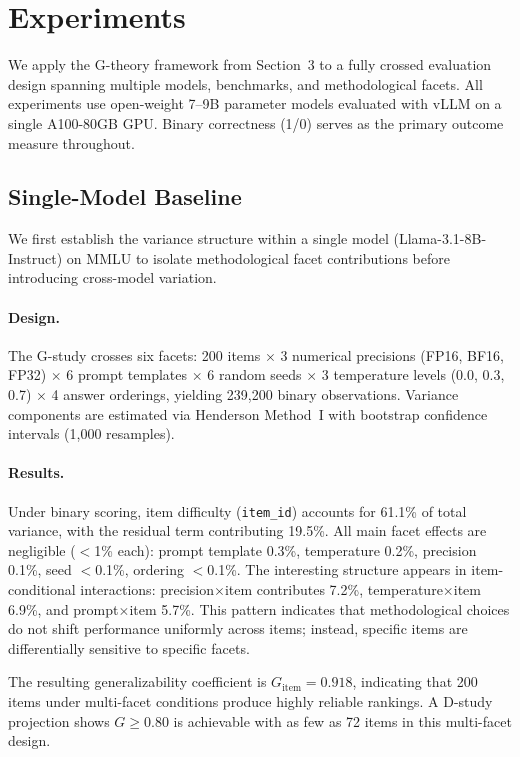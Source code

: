 \section{Experiments}

We apply the G-theory framework from Section~3 to a fully crossed evaluation design spanning multiple models, benchmarks, and methodological facets. All experiments use open-weight 7--9B parameter models evaluated with vLLM on a single A100-80GB GPU. Binary correctness (1/0) serves as the primary outcome measure throughout.

\subsection{Single-Model Baseline}

We first establish the variance structure within a single model (Llama-3.1-8B-Instruct) on MMLU to isolate methodological facet contributions before introducing cross-model variation.

\paragraph{Design.} The G-study crosses six facets: 200 items $\times$ 3 numerical precisions (FP16, BF16, FP32) $\times$ 6 prompt templates $\times$ 6 random seeds $\times$ 3 temperature levels (0.0, 0.3, 0.7) $\times$ 4 answer orderings, yielding 239,200 binary observations. Variance components are estimated via Henderson Method~I with bootstrap confidence intervals (1,000 resamples).

\paragraph{Results.} Under binary scoring, item difficulty (\texttt{item\_id}) accounts for 61.1\% of total variance, with the residual term contributing 19.5\%. All main facet effects are negligible ($<$1\% each): prompt template 0.3\%, temperature 0.2\%, precision 0.1\%, seed $<$0.1\%, ordering $<$0.1\%. The interesting structure appears in item-conditional interactions: precision$\times$item contributes 7.2\%, temperature$\times$item 6.9\%, and prompt$\times$item 5.7\%. This pattern indicates that methodological choices do not shift performance uniformly across items; instead, specific items are differentially sensitive to specific facets.

The resulting generalizability coefficient is $G_\text{item} = 0.918$, indicating that 200 items under multi-facet conditions produce highly reliable rankings. A D-study projection shows $G \geq 0.80$ is achievable with as few as 72 items in this multi-facet design.

